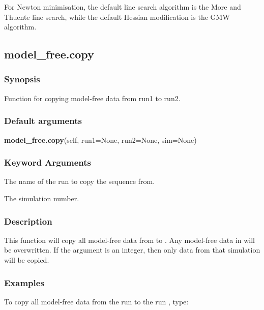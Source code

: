 For Newton minimisation, the default line search algorithm is the More and Thuente line search,
while the default Hessian modification is the GMW algorithm.


\newpage

\subsection{model\_free.copy}


\subsubsection{Synopsis}

Function for copying model-free data from run1 to run2.

\subsubsection{Default arguments}

\textsf{\textbf{model\_free.copy}(self, run1=None, run2=None, sim=None)}


\subsubsection{Keyword Arguments}

  The name of the run to copy the sequence from.

  The simulation number.

\subsubsection{Description}

This function will copy all model-free data from 
 to 
.  Any model-free data in
 will be overwritten.  If the argument 
 is an integer, then only data from that
simulation will be copied.


\subsubsection{Examples}

To copy all model-free data from the run 
 to the run 
, type:





